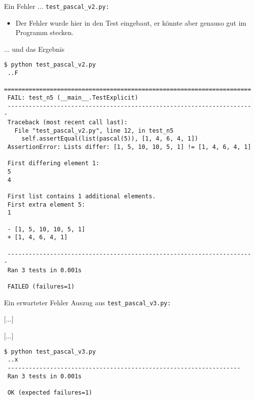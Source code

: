\documentclass[t, utf8x, 10pt]{beamer}
\begin{document}
\begin{frame}{Ein Fehler ...}
 \texttt{test\_pascal\_v2.py:}
 \begin{small}
  
 \end{small}
 \begin{itemize}
  \item Der Fehler wurde hier in den Test eingebaut, er könnte aber genauso
        gut im Programm stecken.
 \end{itemize}
\end{frame}


\begin{frame}[fragile]{... und das Ergebnis}
 \begin{scriptsize}
  \begin{lstlisting}[language={}]
 $ python test_pascal_v2.py
 ..F
 ======================================================================
 FAIL: test_n5 (__main__.TestExplicit)
 ----------------------------------------------------------------------
 Traceback (most recent call last):
   File "test_pascal_v2.py", line 12, in test_n5
     self.assertEqual(list(pascal(5)), [1, 4, 6, 4, 1])
 AssertionError: Lists differ: [1, 5, 10, 10, 5, 1] != [1, 4, 6, 4, 1]

 First differing element 1:
 5
 4

 First list contains 1 additional elements.
 First extra element 5:
 1

 - [1, 5, 10, 10, 5, 1]
 + [1, 4, 6, 4, 1]

 ----------------------------------------------------------------------
 Ran 3 tests in 0.001s

 FAILED (failures=1)
  \end{lstlisting}
 \end{scriptsize}
\end{frame}


\begin{frame}[fragile]{Ein erwarteter Fehler}
 Auszug aus \texttt{test\_pascal\_v3.py:}
 \begin{small}
 
 [...]
 
 [...]
 

 \hrulefill

  \begin{lstlisting}[language={}]
 $ python test_pascal_v3.py
 ..x
 ------------------------------------------------------------------
 Ran 3 tests in 0.001s

 OK (expected failures=1)
  \end{lstlisting}
 \end{small}
\end{frame}
\end{document}
